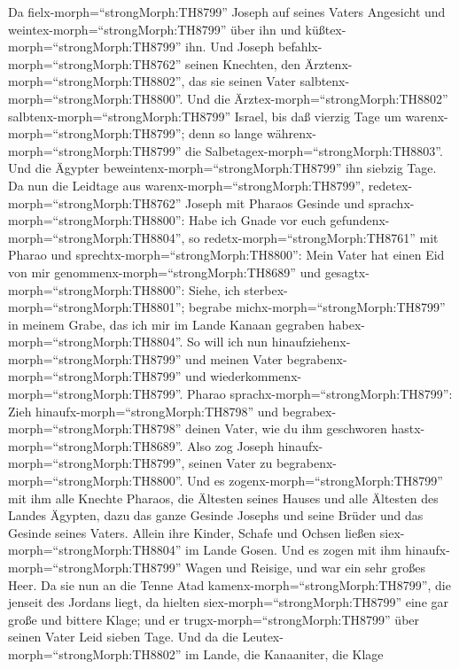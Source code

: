  Da fielx-morph=``strongMorph:TH8799'' Joseph auf seines
Vaters Angesicht und weintex-morph=``strongMorph:TH8799'' über ihn und
küßtex-morph=``strongMorph:TH8799'' ihn.  Und Joseph
befahlx-morph=``strongMorph:TH8762'' seinen Knechten, den
Ärztenx-morph=``strongMorph:TH8802'', das sie seinen Vater
salbtenx-morph=``strongMorph:TH8800''. Und die
Ärztex-morph=``strongMorph:TH8802''
salbtenx-morph=``strongMorph:TH8799'' Israel,  bis daß
vierzig Tage um warenx-morph=``strongMorph:TH8799''; denn so lange
währenx-morph=``strongMorph:TH8799'' die
Salbetagex-morph=``strongMorph:TH8803''. Und die Ägypter
beweintenx-morph=``strongMorph:TH8799'' ihn siebzig Tage. 
Da nun die Leidtage aus warenx-morph=``strongMorph:TH8799'',
redetex-morph=``strongMorph:TH8762'' Joseph mit Pharaos Gesinde und
sprachx-morph=``strongMorph:TH8800'': Habe ich Gnade vor euch
gefundenx-morph=``strongMorph:TH8804'', so
redetx-morph=``strongMorph:TH8761'' mit Pharao und
sprechtx-morph=``strongMorph:TH8800'':  Mein Vater hat einen
Eid von mir genommenx-morph=``strongMorph:TH8689'' und
gesagtx-morph=``strongMorph:TH8800'': Siehe, ich
sterbex-morph=``strongMorph:TH8801''; begrabe
michx-morph=``strongMorph:TH8799'' in meinem Grabe, das ich mir im Lande
Kanaan gegraben habex-morph=``strongMorph:TH8804''. So will ich nun
hinaufziehenx-morph=``strongMorph:TH8799'' und meinen Vater
begrabenx-morph=``strongMorph:TH8799'' und
wiederkommenx-morph=``strongMorph:TH8799''.  Pharao
sprachx-morph=``strongMorph:TH8799'': Zieh
hinaufx-morph=``strongMorph:TH8798'' und
begrabex-morph=``strongMorph:TH8798'' deinen Vater, wie du ihm
geschworen hastx-morph=``strongMorph:TH8689''.  Also zog
Joseph hinaufx-morph=``strongMorph:TH8799'', seinen Vater zu
begrabenx-morph=``strongMorph:TH8800''. Und es
zogenx-morph=``strongMorph:TH8799'' mit ihm alle Knechte Pharaos, die
Ältesten seines Hauses und alle Ältesten des Landes Ägypten,
 dazu das ganze Gesinde Josephs und seine Brüder und das
Gesinde seines Vaters. Allein ihre Kinder, Schafe und Ochsen ließen
siex-morph=``strongMorph:TH8804'' im Lande Gosen.  Und es
zogen mit ihm hinaufx-morph=``strongMorph:TH8799'' Wagen und Reisige,
und war ein sehr großes Heer.  Da sie nun an die Tenne Atad
kamenx-morph=``strongMorph:TH8799'', die jenseit des Jordans liegt, da
hielten siex-morph=``strongMorph:TH8799'' eine gar große und bittere
Klage; und er trugx-morph=``strongMorph:TH8799'' über seinen Vater Leid
sieben Tage.  Und da die
Leutex-morph=``strongMorph:TH8802'' im Lande, die Kanaaniter, die Klage
